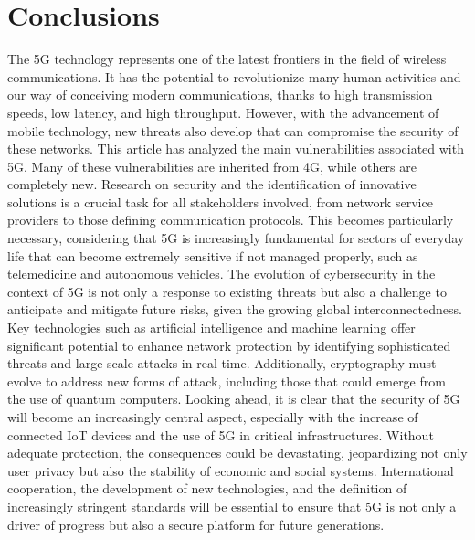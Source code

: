 \documentclass[english]{article}
\begin{document}
\section{Conclusions}\label{Conclusions}
The 5G technology represents one of the latest frontiers in the field of
wireless communications. It has the potential to revolutionize many human
activities and our way of conceiving modern communications, thanks to high
transmission speeds, low latency, and high throughput. However, with the
advancement of mobile technology, new threats also develop that can compromise
the security of these networks. This article has analyzed the main
vulnerabilities associated with 5G. Many of these vulnerabilities are inherited
from 4G, while others are completely new. Research on security and the
identification of innovative solutions is a crucial task for all stakeholders
involved, from network service providers to those defining communication
protocols. This becomes particularly necessary, considering that 5G is
increasingly fundamental for sectors of everyday life that can become extremely
sensitive if not managed properly, such as telemedicine and autonomous
vehicles. The evolution of cybersecurity in the context of 5G is not only a
response to existing threats but also a challenge to anticipate and mitigate
future risks, given the growing global interconnectedness. Key technologies
such as artificial intelligence and machine learning offer significant
potential to enhance network protection by identifying sophisticated threats
and large-scale attacks in real-time. Additionally, cryptography must evolve to
address new forms of attack, including those that could emerge from the use of
quantum computers. Looking ahead, it is clear that the security of 5G will
become an increasingly central aspect, especially with the increase of
connected IoT devices and the use of 5G in critical infrastructures. Without
adequate protection, the consequences could be devastating, jeopardizing not
only user privacy but also the stability of economic and social systems.
International cooperation, the development of new technologies, and the
definition of increasingly stringent standards will be essential to ensure that
5G is not only a driver of progress but also a secure platform for future
generations.
\end{document}
